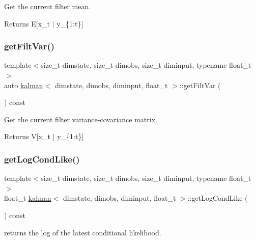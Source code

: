 Get the current filter mean. 

\begin{DoxyReturn}{Returns}
E\mbox{[}x\+\_\+t $\vert$ y\+\_\+\{1\+:t\}\mbox{]} 
\end{DoxyReturn}
\mbox{\label{classkalman_af88f227e98383b222dc765b11df626c1}} 
\subsubsection{\texorpdfstring{get\+Filt\+Var()}{getFiltVar()}}
{\footnotesize\ttfamily template$<$size\+\_\+t dimstate, size\+\_\+t dimobs, size\+\_\+t diminput, typename float\+\_\+t $>$ \\
auto \hyperlink{classkalman}{kalman}$<$ dimstate, dimobs, diminput, float\+\_\+t $>$\+::get\+Filt\+Var (\begin{DoxyParamCaption}{ }\end{DoxyParamCaption}) const}



Get the current filter variance-\/covariance matrix. 

\begin{DoxyReturn}{Returns}
V\mbox{[}x\+\_\+t $\vert$ y\+\_\+\{1\+:t\}\mbox{]} 
\end{DoxyReturn}
\mbox{\label{classkalman_aaf359a2d65f4f0ae8eb26603205b6f9b}} 
\subsubsection{\texorpdfstring{get\+Log\+Cond\+Like()}{getLogCondLike()}}
{\footnotesize\ttfamily template$<$size\+\_\+t dimstate, size\+\_\+t dimobs, size\+\_\+t diminput, typename float\+\_\+t $>$ \\
float\+\_\+t \hyperlink{classkalman}{kalman}$<$ dimstate, dimobs, diminput, float\+\_\+t $>$\+::get\+Log\+Cond\+Like (\begin{DoxyParamCaption}{ }\end{DoxyParamCaption}) const\hspace{0.3cm}{\ttfamily [virtual]}}



returns the log of the latest conditional likelihood. 

